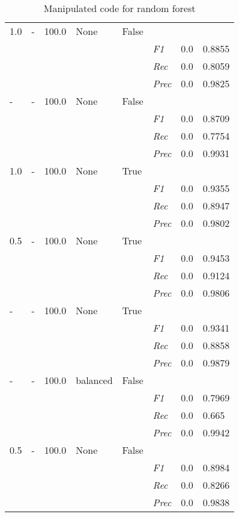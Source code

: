 \begin{table}[]
\begin{tabularx}{\textwidth}{XXXXX|X|X|X}
1.0 & - & 100.0 & None & False & &  \\
& & & & & \textit{F1} & 0.0 & 0.8855        \\
& & & & & \textit{Rec} &  0.0 & 0.8059    \\
& & & & & \textit{Prec} & 0.0 & 0.9825  \\ \midrule
- & - & 100.0 & None & False & &  \\
& & & & & \textit{F1} & 0.0 & 0.8709        \\
& & & & & \textit{Rec} &  0.0 & 0.7754    \\
& & & & & \textit{Prec} & 0.0 & 0.9931  \\ \midrule
1.0 & - & 100.0 & None & True & &  \\
& & & & & \textit{F1} & 0.0 & 0.9355        \\
& & & & & \textit{Rec} &  0.0 & 0.8947    \\
& & & & & \textit{Prec} & 0.0 & 0.9802  \\ \midrule
0.5 & - & 100.0 & None & True & &  \\
& & & & & \textit{F1} & 0.0 & 0.9453        \\
& & & & & \textit{Rec} &  0.0 & 0.9124    \\
& & & & & \textit{Prec} & 0.0 & 0.9806  \\ \midrule
- & - & 100.0 & None & True & &  \\
& & & & & \textit{F1} & 0.0 & 0.9341        \\
& & & & & \textit{Rec} &  0.0 & 0.8858    \\
& & & & & \textit{Prec} & 0.0 & 0.9879  \\ \midrule
- & - & 100.0 & balanced & False & &  \\
& & & & & \textit{F1} & 0.0 & 0.7969        \\
& & & & & \textit{Rec} &  0.0 & 0.665    \\
& & & & & \textit{Prec} & 0.0 & 0.9942  \\ \midrule
0.5 & - & 100.0 & None & False & &  \\
& & & & & \textit{F1} & 0.0 & 0.8984        \\
& & & & & \textit{Rec} &  0.0 & 0.8266    \\
& & & & & \textit{Prec} & 0.0 & 0.9838  \\ \midrule
\end{tabularx}
\caption{Manipulated code for random forest}
\label{tab:rq3_random_forest}
\end{table}

